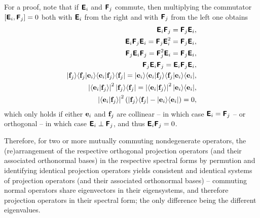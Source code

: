 {\color{OliveGreen}\bproof
For a proof,
note that if $\textsf{\textbf{E}}_{i}$
and
$\textsf{\textbf{F}}_{j}$ commute, then  multiplying the commutator
$\left[
\textsf{\textbf{E}}_{i}
,
\textsf{\textbf{F}}_{j}
\right]=0$
both with
$\textsf{\textbf{E}}_{i}$ from the right
and  with
$\textsf{\textbf{F}}_{j}$ from the left one obtains
\begin{equation}
\begin{split}
\textsf{\textbf{E}}_{i}
\textsf{\textbf{F}}_{j}
=
\textsf{\textbf{F}}_{j}
\textsf{\textbf{E}}_{i}
,\\
\textsf{\textbf{E}}_{i}
\textsf{\textbf{F}}_{j}\textsf{\textbf{E}}_{i}
=
\textsf{\textbf{F}}_{j}
\textsf{\textbf{E}}_{i}^2
=
\textsf{\textbf{F}}_{j}
\textsf{\textbf{E}}_{i}
,\\
\textsf{\textbf{F}}_{j}\textsf{\textbf{E}}_{i}
\textsf{\textbf{F}}_{j}
=
\textsf{\textbf{F}}_{j}^2
\textsf{\textbf{E}}_{i}
=
\textsf{\textbf{F}}_{j}
\textsf{\textbf{E}}_{i}
,\\
\textsf{\textbf{F}}_{j}\textsf{\textbf{E}}_{i}
\textsf{\textbf{F}}_{j}
=
\textsf{\textbf{E}}_{i}
\textsf{\textbf{F}}_{j}\textsf{\textbf{E}}_{i}
,\\
\vert {\bf f}_j \rangle  \langle {\bf f}_j \vert {\bf e}_i \rangle \langle {\bf e}_i \vert {\bf f}_j \rangle \langle {\bf f}_j \vert
=
 \vert {\bf e}_i \rangle \langle {\bf e}_i \vert {\bf f}_j \rangle \langle {\bf f}_j \vert {\bf e}_i \rangle  \langle {\bf e}_i \vert
,\\
\left|\langle {\bf e}_i \vert {\bf f}_j \rangle\right|^2
\vert {\bf f}_j \rangle \langle {\bf f}_j \vert
=
\left|\langle {\bf e}_i \vert {\bf f}_j \rangle\right|^2
 \vert {\bf e}_i \rangle \langle {\bf e}_i \vert
,                                               \\
\left|\langle {\bf e}_i \vert {\bf f}_j \rangle\right|^2 \left(
\vert {\bf f}_j \rangle \langle {\bf f}_j \vert   -
 \vert {\bf e}_i \rangle \langle {\bf e}_i \vert \right) =    0
,
\end{split}
\end{equation}
which   only holds if either
${\bf e}_i$
and
${\bf f}_j$
are collinear -- in which case
$\textsf{\textbf{E}}_{i} = \textsf{\textbf{F}}_{j}$ --
or orthogonal
 -- in which case
$\textsf{\textbf{E}}_{i} \perp  \textsf{\textbf{F}}_{j}$,
and thus
$\textsf{\textbf{E}}_{i} \textsf{\textbf{F}}_{j} = 0$.
\eproof
}

Therefore, for two or more mutually commuting nondegenerate operators,
the (re)arrangement of the respective orthogonal projection operators (and their associated orthonormal bases)
in the respective spectral forms by
permution and identifying identical projection operators
yields consistent and identical systems of projection operators (and their associated orthonormal bases) --
commuting normal operators share  eigenvectors in their eigensystems, and therefore projection operators in their spectral form;
the only difference being the different eigenvalues.

